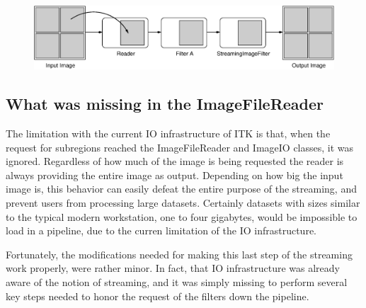 \documentclass{InsightArticle}
\begin{document}
\begin{figure}
\center
\includegraphics[width=1.0\textwidth]{StreamingConceptDiagram.eps}
\label{fig:StreamingConceptDiagram}
\end{figure}



\subsection{What was missing in the ImageFileReader}

The limitation with the current IO infrastructure of ITK is that, when the
request for subregions reached the ImageFileReader and ImageIO classes, it was
ignored. Regardless of how much of the image is being requested the reader is
always providing the entire image as output. Depending on how big the input
image is, this behavior can easily defeat the entire purpose of the streaming,
and prevent users from processing large datasets. Certainly datasets with sizes
similar to the typical modern workstation, one to four gigabytes, would be
impossible to load in a pipeline, due to the curren limitation of the IO
infrastructure.

Fortunately, the modifications needed for making this last step of the
streaming work properly, were rather minor. In fact, that IO infrastructure was
already aware of the notion of streaming, and it was simply missing to perform
several key steps needed to honor the request of the filters down the pipeline.
\end{document}
